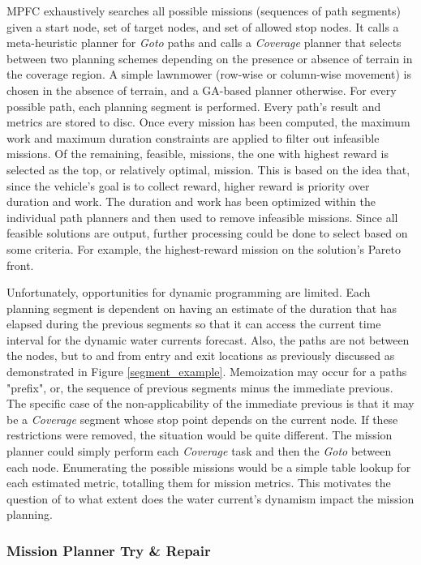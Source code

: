 \documentclass{tamuccthesis}
\begin{document}
MPFC exhaustively searches all possible missions (sequences of path segments) given a start node, set of target nodes, and set of allowed stop nodes. It calls a meta-heuristic planner for \textit{Goto} paths and calls a \textit{Coverage} planner that selects between two planning schemes depending on the presence or absence of terrain in the coverage region. A simple lawnmower (row-wise or column-wise movement) is chosen in the absence of terrain, and a GA-based planner otherwise. For every possible path, each planning segment is performed. Every path's result and metrics are stored to disc. Once every mission has been computed, the maximum work and maximum duration constraints are applied to filter out infeasible missions. Of the remaining, feasible, missions, the one with highest reward is selected as the top, or relatively optimal, mission. This is based on the idea that, since the vehicle's goal is to collect reward, higher reward is priority over duration and work. The duration and work has been optimized within the individual path planners and then used to remove infeasible missions. Since all feasible solutions are output, further processing could be done to select based on some criteria. For example, the highest-reward mission on the solution's Pareto front.

Unfortunately, opportunities for dynamic programming are limited. Each planning segment is dependent on having an estimate of the duration that has elapsed during the previous segments so that it can access the current time interval for the dynamic water currents forecast. Also, the paths are not between the nodes, but to and from entry and exit locations as previously discussed as demonstrated in Figure \ref{segment_example}. Memoization may occur for a paths "prefix", or, the sequence of previous segments minus the immediate previous. The specific case of the non-applicability of the immediate previous is that it may be a \textit{Coverage} segment whose stop point depends on the current node. If these restrictions were removed, the situation would be quite different. The mission planner could simply perform each \textit{Coverage} task and then the \textit{Goto} between each node. Enumerating the possible missions would be a simple table lookup for each estimated metric, totalling them for mission metrics. This motivates the question of to what extent does the water current's dynamism impact the mission planning. 


\subsubsection{Mission Planner Try \& Repair}
\end{document}
